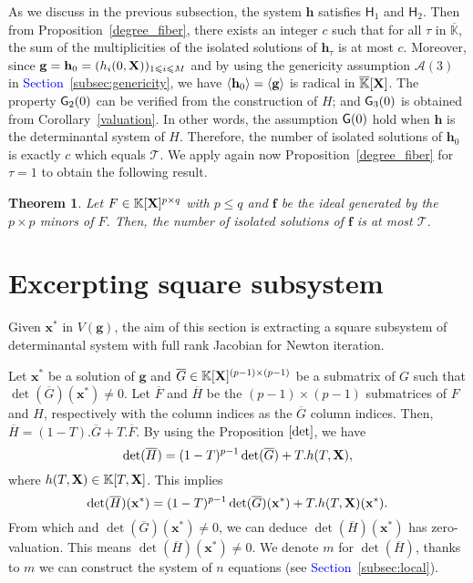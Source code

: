 \documentclass[11pt]{article}
\numberwithin{Property}{section}
\newtheorem{Theorem}{Theorem}%
\numberwithin{Theorem}{section}
\numberwithin{Proposition}{section}
\numberwithin{Lemma}{section}
\numberwithin{Corollary}{section}
\numberwithin{Definition}{section}
\numberwithin{Remark}{section}
\numberwithin{Conjecture}{section}
\numberwithin{Problem}{section}
\numberwithin{Claim}{section}
\theoremstyle{definition}
\numberwithin{Example}{section}
\def\f {\ensuremath{\mathbf{f}}}
\def\h {\ensuremath{\mathbf{h}}}
\def\g {\ensuremath{\mathbf{g}}}
\renewcommand{\leq}{\leqslant}
\def\bar{\overline}
\newcommand{\field}{\mathbb{K}} %
\newcommand{\mat}[1]{\mathbf{\MakeUppercase{#1}}} %
\newcommand{\improve}[1]{\textcolor{blue}{#1}} %
\begin{document}
As we discuss in the previous subsection, the system $\h$ satisfies $\mathsf{H}_1$ and $\mathsf{H}_2$. Then from Proposition~\ref{degree_fiber}, there exists an integer $c$ such that for all $\tau$ in $\bar{\field}$, the sum of the multiplicities of the isolated solutions of $\mathbf{h}_\tau$ is at most $c$.  Moreover, since $\g = {\bf{h}}_0 = (h_i(0,\mat{X}))_{1 \leq i \leq M}$ and by using the genericity assumption $\mathcal{A}(3)$ in \improve{Section~\ref{subsec:genericity}}, we have $\langle {\bf{h}}_0 \rangle = \langle \g \rangle$ is radical in $\bar{\field}[\mat{X}]$. The property ${\sf G}_2(0)$ can be verified from the construction of $H$; and ${\sf G}_3(0)$ is obtained from Corollary~\ref{valuation}. In other words, the assumption ${\sf G}(0)$ hold when $\h$ is the determinantal system of $H$. Therefore, the number of isolated solutions of $\mathbf{h}_0$ is exactly $c$ which equals $\mathcal{T}$. We apply again now Proposition~\ref{degree_fiber} for $\tau = 1$ to obtain the following result. 
\begin{Theorem}
Let $F \in \field[\mat{X}]^{p \times q}$ with $p \leq q$ and $\f$ be the ideal generated by the $p \times p$ minors of $F$. Then, the number of isolated solutions of $\f$ is at most $\mathcal{T}$. 
\end{Theorem}
\section{Excerpting square subsystem}
\label{sec:extractsubsystem}
Given $\mathbf{x}^*$ in $V(\g)$, the aim of this section is extracting a square subsystem of determinantal system with full rank Jacobian for Newton iteration. 

Let $\mathbf{x}^*$ be a solution of $\g$ and $\bar{G} \in \field[\mat{X}]^{(p-1) \times (p-1)}$ be a submatrix of $G$ such that $\det(\bar{G})(\mathbf{x}^*) \ne 0$. Let $\bar{F}$ and $\bar{H}$ be the $(p-1) \times (p-1)$ submatrices of $F$ and $H$, respectively with the column indices as the $\bar{G}$ column indices. Then, $\bar{H} = (1-T).\bar{G} + T.\bar{F}$. By using the Proposition $\ref{det}$, we have 
\[
\det(\bar{H}) = (1-T)^{p-1} \det(\bar{G}) + T.h(T,\mat{X}),
\] where $h(T,\mat{X}) \in \field[T,\mat{X}]$. This implies 
\[
\det(\bar{H})(\mathbf{x}^*) = (1-T)^{p-1} \det(\bar{G})(\mathbf{x}^*) + T.h(T,\mat{X})(\mathbf{x}^*). 
\] From which and $\det(\bar{G})(\mathbf{x}^*) \ne 0$, we can deduce $\det(\bar{H})(\mathbf{x}^*)$ has zero-valuation. This means $\det(\bar{H})(\mathbf{x}^*) \ne 0$. We denote $m$ for $\det(\bar{H})$, thanks to $m$ we can construct the system of $n$ equations (see \improve{Section~\ref{subsec:local}}). 
\end{document}
